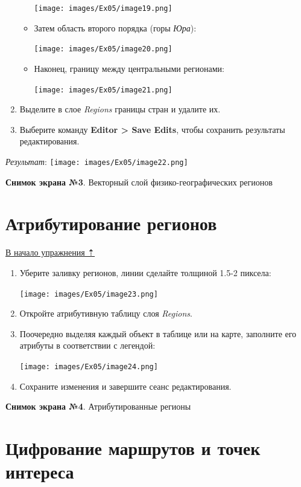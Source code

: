 \documentclass[12pt,]{book}
\begin{document}
\begin{enumerate}
\begin{itemize}
    \texttt{[image: images/Ex05/image19.png]}
  \item
    Затем область второго порядка (горы \emph{Юра}):

    \texttt{[image: images/Ex05/image20.png]}
  \item
    Наконец, границу между центральными регионами:

    \texttt{[image: images/Ex05/image21.png]}
  \end{itemize}
\item
  Выделите в слое \emph{Regions} границы стран и удалите их.
\item
  Выберите команду \textbf{Editor \textgreater{} Save Edits}, чтобы сохранить результаты редактирования.
\end{enumerate}

\emph{Результат}:
\texttt{[image: images/Ex05/image22.png]}

\textbf{Снимок экрана №3}. Векторный слой физико-географических регионов

\hypertarget{map-ref-general-attributes}{%
\section{Атрибутирование регионов}\label{map-ref-general-attributes}}

\protect\hyperlink{map-ref-general}{В начало упражнения ⇡}

\begin{enumerate}
\def\labelenumi{\arabic{enumi}.}
\item
  Уберите заливку регионов, линии сделайте толщиной 1.5-2 пиксела:

  \texttt{[image: images/Ex05/image23.png]}
\item
  Откройте атрибутивную таблицу слоя \emph{Regions}.
\item
  Поочередно выделяя каждый объект в таблице или на карте, заполните его атрибуты в соответствии с легендой:

  \texttt{[image: images/Ex05/image24.png]}
\item
  Сохраните изменения и завершите сеанс редактирования.
\end{enumerate}

\textbf{Снимок экрана №4}. Атрибутированные регионы

\hypertarget{map-ref-general-routes-poi}{%
\section{Цифрование маршрутов и точек интереса}\label{map-ref-general-routes-poi}}
\end{document}
